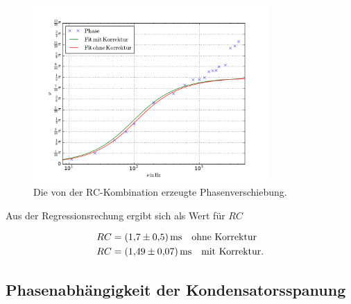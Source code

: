 \FloatBarrier
\begin{figure}
  \centering
  \includegraphics[width=0.8\textwidth]{pics/frequenz_phase.pdf}
  \caption{Die von der RC-Kombination erzeugte Phasenverschiebung.}
  \label{fig:plot_teil_c}
\end{figure}
\FloatBarrier

Aus der Regressionsrechung ergibt sich als Wert für $RC$

\begin{align}
  \label{eq:teil_c_rc}
  \begin{aligned}
    RC&=\SI{1.7\pm0.5}{\milli\second} \quad \text{ohne Korrektur} \\
    RC& =\SI{1.49\pm0.07}{\milli\second} \quad \text{mit Korrektur}.
\end{aligned}
\end{align}

\subsection{Phasenabhängigkeit der Kondensatorsspanung}

